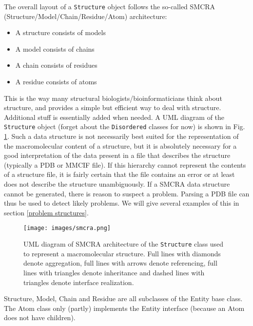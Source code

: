 The overall layout of a \texttt{Structure} object follows the so-called SMCRA
(Structure/Model/Chain/Residue/Atom) architecture:

\begin{itemize}
\item A structure consists of models
\item A model consists of chains
\item A chain consists of residues
\item A residue consists of atoms
\end{itemize}
This is the way many structural biologists/bioinformaticians think
about structure, and provides a simple but efficient way to deal with
structure. Additional stuff is essentially added when needed. A UML
diagram of the \texttt{Structure} object (forget about the \texttt{Disordered}
classes for now) is shown in Fig. \ref{fig:smcra}. Such a data structure is not
necessarily best suited for the representation of the macromolecular content of
a structure, but it is absolutely necessary for a good interpretation of the
data present in a file that describes the structure (typically a PDB or MMCIF
file). If this hierarchy cannot represent the contents of a structure file, it
is fairly certain that the file contains an error or at least does not describe
the structure unambiguously. If a SMCRA data structure cannot be generated,
there is reason to suspect a problem. Parsing a PDB file can thus be used to
detect likely problems. We will give several examples of this in section
\ref{problem structures}.

\begin{figure}[htbp]
\begin{htmlonly}
\end{htmlonly}
\begin{latexonly}
\centering
\texttt{[image: images/smcra.png]}
\end{latexonly}
\caption{UML diagram of SMCRA architecture of the \texttt{Structure} class used to represent a macromolecular structure.
Full lines with diamonds denote aggregation, full lines with
arrows denote referencing, full lines with triangles denote inheritance
and dashed lines with triangles denote interface realization.}
\label{fig:smcra}
\end{figure}

Structure, Model, Chain and Residue are all subclasses of the Entity base class.
The Atom class only (partly) implements the Entity interface (because an Atom
does not have children).

